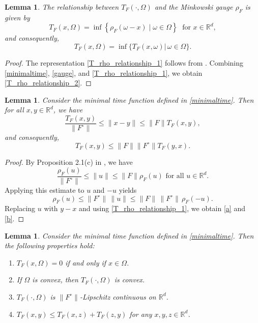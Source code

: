 \documentclass[sn-mathphys-num]{sn-jnl}%
\newtheorem{lemma}[theorem]{Lemma}
\theoremstyle{definition}
\begin{document}
\begin{lemma}
	\label{T_rho_relationship}
	The relationship between $T_F(\cdot,\Omega)$ and the Minkowski gauge $\rho_F$ is given by
	\begin{equation}
		\label{T_rho_relationship_1}
		T_F(x,\Omega) = \inf \left\{ \rho_F(\omega - x) \mid \omega \in \Omega \right\}\;\text{ for } x \in \mathbb{R}^d,
	\end{equation}
	and consequently,
	\begin{equation}
		\label{T_rho_relationship_2}
		T_F(x,\Omega)=\inf\{T_F(x,\omega) \big| \, \omega \in \Omega\}.
	\end{equation}
\end{lemma}
\begin{proof}
	The representation \eqref{T_rho_relationship_1} follows from 
	\cite[Theorem~6.19]{mordukhovich2023easy}. 
	Combining \eqref{minimaltime}, \eqref{gauge}, and \eqref{T_rho_relationship_1}, 
	we obtain \eqref{T_rho_relationship_2}.
\end{proof}

\begin{lemma}
	\label{T_lemma} Consider the minimal time function defined in \eqref{minimaltime}. Then
	for all $x,y \in \mathbb{R}^d$, we have
	\begin{equation} \label{a}
		\frac{T_F(x,y)}{\|F^\circ\|} \leq \| x - y \| \leq \|F\| T_F(x,y),
	\end{equation}
	and consequently,
	\begin{equation}\label{b}
		T_F(x,y) \leq \|F\|\|F^\circ\|T_F(y,x).    
	\end{equation}
\end{lemma}
\begin{proof}
	By Proposition 2.1(c) in \cite{colombo2004subgradient}, we have 
	\[
	\frac{\rho_F(u)}{\|F^\circ\|} \leq \|u\| \leq \|F\| \rho_F(u) \text{ for all } u \in \mathbb{R}^d.
	\]
	Applying this estimate to $u$ and $-u$ yields
	\[
	\rho_F(u) \le \|F^\circ\|\,\|u\|
	\le \|F\|\,\|F^\circ\|\,\rho_F(-u).
	\]
	Replacing $u$ with $y-x$ and using \eqref{T_rho_relationship_1}, we obtain \eqref{a} and \eqref{b}.
\end{proof}

\begin{lemma}\label{Preliminaries_2}
	Consider the minimal time function defined in \eqref{minimaltime}. Then the following properties hold:
	\begin{enumerate}
		\item [{\rm (a)}] $T_F(x,\Omega) = 0$ if and only if $x \in \Omega$.
		\item [{\rm (b)}] If $\Omega$ is convex, then $T_F(\cdot,\Omega)$ is convex. 
		\item [{\rm (c)}] $T_F(\cdot,\Omega)$ is $\|F^\circ\|$-Lipschitz continuous on $\mathbb{R}^d$.
		\item [{\rm (d)}] $T_F(x,y) \leq T_F(x,z)+T_F(z,y)$ for any $x,y,z \in \mathbb{R}^d$.
	\end{enumerate}
\end{lemma}
\end{document}
